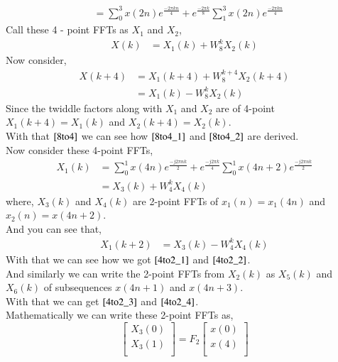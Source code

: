 \documentclass[journal,12pt,twocolumn]{IEEEtran}
\renewcommand\thesection{\arabic{section}}
\begin{document}
\begin{enumerate}[label=\arabic*.,ref=\thesection.\theenumi]
\begin{align}
            &= \sum_{0}^{3}x(2n)e^{\frac{-2 \pi kn}{4}} + e^{\frac{-2 \pi k}{8}}\sum_{1}^{3}x(2n)e^{\frac{-2 \pi kn}{4}}
      \end{align}
     Call these 4 - point FFTs as $X_1$ and $X_2$,
      \begin{align}
        X(k) & =X_1(k) + W_{8}^kX_2(k)
      \end{align}  
    Now consider,
      \begin{align}
        X(k+4) &= X_1(k+4)  + W_{8}^{k + 4}X_2(k+4)\\
               & = X_1(k) -W_{8}^kX_2(k) \label{8to4} 	      
       \end{align}
    Since the twiddle factors along with $X_1$ and $X_2$ are of 4-point $X_1(k+4) =X_1(k)$ and $X_2(k+4) = X_2(k)$. \\
    With that $\eqref{8to4}$ we can see how $\eqref{8to4_1}$ and $\eqref{8to4_2}$ are derived.\\
    Now consider these 4-point FFTs,
     \begin{align}
       X_1(k) &= \sum_{0}^{1}x(4n)e^{\frac{-j 2\pi nk}{2}} + e^{\frac{-j2\pi k}{4}}\sum_{0}^{1}x(4n+2)e^{\frac{-j2\pi nk}{2}} \\
            &= X_3(k) + W_4^kX_4(k)
       \end{align}
     where, $X_3(k)$ and $X_4(k)$ are 2-point FFTs of $x_1(n) = x_1(4n)$ and $x_2(n) = x(4n+2)$.\\
     And you can see that,
      \begin{align}
        X_1(k+2) &= X_3(k) - W_{4}^kX_4(k)
      \end{align}
    With that we can see how we got $\eqref{4to2_1}$ and $\eqref{4to2_2}$. \\
    And similarly we can write the 2-point FFTs from $X_2(k)$ as $X_5(k)$  and $X_6(k)$ of subsequences $x(4n+1)$ and $x(4n+3)$.\\
    With that we can get $\eqref{4to2_3}$ and $\eqref{4to2_4}$. \\
    Mathematically we can write these 2-point FFTs as,
    \begin{equation}
      \begin{bmatrix}
        X_{3}(0) \\ 
        X_{3}(1)\\ 
      \end{bmatrix}
      = F_{2}
      \begin{bmatrix}
        x(0) \\ 
        x(4) \\ 

\end{bmatrix}
\end{equation}
\end{enumerate}
\end{document}
